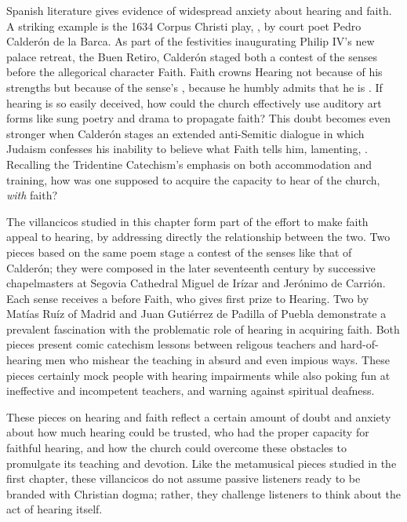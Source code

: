 \documentclass{vcbook-proposal}
\begin{document}
Spanish literature gives evidence of widespread anxiety about hearing and faith.
A striking example is the 1634 Corpus Christi play, , by court poet Pedro Calderón de la Barca.%
    \Autocite{Calderon:Retiro}
As part of the festivities inaugurating Philip IV's new palace retreat, the 
Buen Retiro, Calderón staged both a contest of the senses before the allegorical
character Faith.
Faith crowns Hearing not because of his strengths but because of the sense's 
, because he humbly admits that he is .
If hearing is so easily deceived, how could the church effectively use auditory
art forms like sung poetry and drama to propagate faith?  
This doubt becomes even stronger when Calderón stages an extended anti-Semitic 
dialogue in which Judaism confesses his inability to believe what Faith tells
him, lamenting, .
Recalling the Tridentine Catechism's emphasis on both accommodation and 
training, how was one supposed to acquire the capacity to hear  of the church, \emph{with} faith?

The villancicos studied in this chapter form part of the effort to make faith
appeal to hearing, by addressing directly the relationship between the two.
Two pieces based on the same poem stage a contest of the senses like that of
Calderón; they were composed in the later seventeenth century by successive
chapelmasters at Segovia Cathedral Miguel de Irízar and Jerónimo de Carrión.
Each sense receives a  before Faith, who gives first prize to
Hearing.
Two  by Matías Ruíz of Madrid and Juan 
Gutiérrez de Padilla of Puebla demonstrate a prevalent fascination with the 
problematic role of hearing in acquiring faith.
Both pieces present comic catechism lessons between religous teachers and 
hard-of-hearing men who mishear the teaching in absurd and even impious ways.
These pieces certainly mock people with hearing impairments while also poking
fun at ineffective and incompetent teachers, and warning against spiritual
deafness.

These pieces on hearing and faith reflect a certain amount of doubt and anxiety 
about how much hearing could be trusted, who had the proper capacity for 
faithful hearing, and how the church could overcome these obstacles to 
promulgate its teaching and devotion.
Like the metamusical pieces studied in the first chapter, these villancicos do 
not assume passive listeners ready to be branded with Christian dogma; rather, 
they challenge listeners to think about the act of hearing itself.
\end{document}

